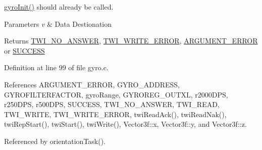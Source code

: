 \hyperlink{group__gyro_ga276b9ab6ac85c65b5a55356c00958be7}{gyro\-Init()} should already be called. 
\begin{DoxyParams}{Parameters}
{\em v} & Data Destionation \\
\hline
\end{DoxyParams}
\begin{DoxyReturn}{Returns}
\hyperlink{group__error_gga2c3e4bb40f36b262a5214e2da2bca9c5a04d5943ba652af2205c88b247e0c659c}{T\-W\-I\-\_\-\-N\-O\-\_\-\-A\-N\-S\-W\-E\-R}, \hyperlink{group__error_gga2c3e4bb40f36b262a5214e2da2bca9c5ac0e3b3463dcaf220e54794b4711708c9}{T\-W\-I\-\_\-\-W\-R\-I\-T\-E\-\_\-\-E\-R\-R\-O\-R}, \hyperlink{group__error_gga2c3e4bb40f36b262a5214e2da2bca9c5a49ccf277a69dd938c591928aa27c66cc}{A\-R\-G\-U\-M\-E\-N\-T\-\_\-\-E\-R\-R\-O\-R} or \hyperlink{group__error_gga2c3e4bb40f36b262a5214e2da2bca9c5ac7f69f7c9e5aea9b8f54cf02870e2bf8}{S\-U\-C\-C\-E\-S\-S} 
\end{DoxyReturn}


Definition at line 99 of file gyro.\-c.



References A\-R\-G\-U\-M\-E\-N\-T\-\_\-\-E\-R\-R\-O\-R, G\-Y\-R\-O\-\_\-\-A\-D\-D\-R\-E\-S\-S, G\-Y\-R\-O\-F\-I\-L\-T\-E\-R\-F\-A\-C\-T\-O\-R, gyro\-Range, G\-Y\-R\-O\-R\-E\-G\-\_\-\-O\-U\-T\-X\-L, r2000\-D\-P\-S, r250\-D\-P\-S, r500\-D\-P\-S, S\-U\-C\-C\-E\-S\-S, T\-W\-I\-\_\-\-N\-O\-\_\-\-A\-N\-S\-W\-E\-R, T\-W\-I\-\_\-\-R\-E\-A\-D, T\-W\-I\-\_\-\-W\-R\-I\-T\-E, T\-W\-I\-\_\-\-W\-R\-I\-T\-E\-\_\-\-E\-R\-R\-O\-R, twi\-Read\-Ack(), twi\-Read\-Nak(), twi\-Rep\-Start(), twi\-Start(), twi\-Write(), Vector3f\-::x, Vector3f\-::y, and Vector3f\-::z.



Referenced by orientation\-Task().


